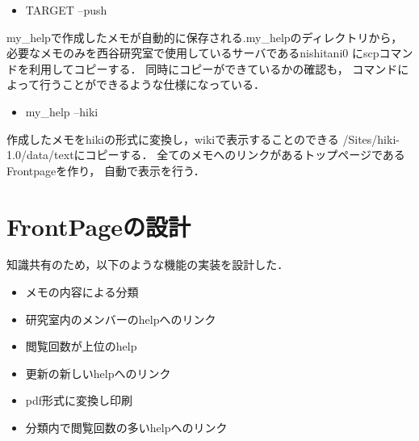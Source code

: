 \documentclass[10pt,a4j,twocolumn]{jsarticle}
\begin{document}
\begin{itemize}
\item TARGET --push
\end{itemize}
\begin{description}
\item my\_helpで作成したメモが自動的に保存される.my\_helpのディレクトリから，
必要なメモのみを西谷研究室で使用しているサーバであるnishitani0
にscpコマンドを利用してコピーする．
同時にコピーができているかの確認も，
コマンドによって行うことができるような仕様になっている．
\end{description}
\begin{itemize}
\item my\_help --hiki 
\end{itemize}
\begin{description}
\item 作成したメモをhikiの形式に変換し，wikiで表示することのできる
/Sites/hiki-1.0/data/textにコピーする．
全てのメモへのリンクがあるトップページであるFrontpageを作り，
自動で表示を行う．
\end{description}

\section{FrontPageの設計}
知識共有のため，以下のような機能の実装を設計した．

\begin{itemize}
\item メモの内容による分類
\item 研究室内のメンバーのhelpへのリンク
\item 閲覧回数が上位のhelp
\item 更新の新しいhelpへのリンク
\item pdf形式に変換し印刷
\item 分類内で閲覧回数の多いhelpへのリンク
\end{itemize}
\end{document}
